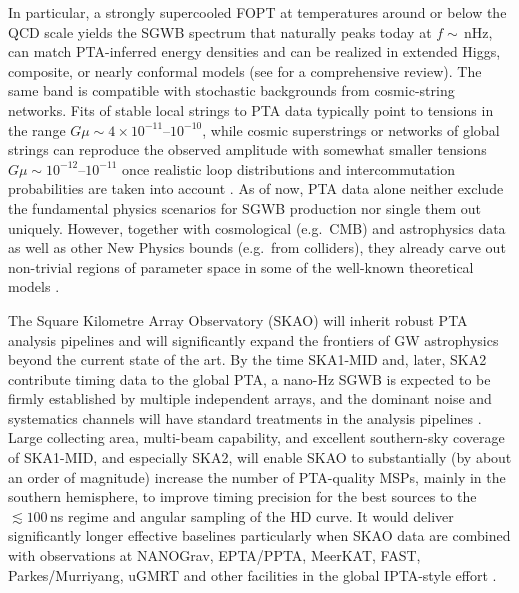 \documentclass[a4paper,11pt]{article}
\begin{document}
In particular, a strongly supercooled FOPT at temperatures around or below the QCD 
scale yields the SGWB spectrum that naturally peaks today at $f\sim\,$nHz, can match 
PTA-inferred energy densities and can be realized in extended Higgs, composite, or 
nearly conformal models (see \citep{Caprini:2018csg} for a comprehensive review). 
The same band is compatible with stochastic backgrounds from cosmic-string networks. 
Fits of stable local strings to PTA data typically point to tensions in the range 
$G\mu \sim 4\times 10^{-11}$–$10^{-10}$, while cosmic superstrings or networks of 
global strings can reproduce the observed amplitude with somewhat smaller tensions 
$G\mu \sim 10^{-12}$–$10^{-11}$ once realistic loop distributions and intercommutation
probabilities are taken into account \citep{Ellis:2020ena,Blasi:2020mfx,
Ellis:2023tsl,Wang:2023CSloops,Kume:2024CSbounds}. As of now, PTA data 
alone neither exclude the fundamental physics scenarios for SGWB production nor single 
them out uniquely. However, together with cosmological (e.g.~CMB) and astrophysics data 
as well as other New Physics bounds (e.g.~from colliders), they already carve out non-trivial 
regions of parameter space in some of the well-known theoretical models
\citep{Caldwell:2022DEUGW,Bian:2025GWcosmology,Roshan:2025FirstSecond}.

The Square Kilometre Array Observatory (SKAO) will inherit robust PTA analysis pipelines and
will significantly expand the frontiers of GW astrophysics beyond the current state of the art. 
By the time SKA1-MID and, later, SKA2 contribute timing data to the global PTA, a nano-Hz SGWB 
is expected to be firmly established by multiple independent arrays, and the dominant noise 
and systematics channels will have standard treatments in the analysis pipelines
\citep{Antoniadis:2022yph,Taylor:2025SKAReview}. Large collecting area, multi-beam capability, 
and excellent southern-sky coverage of SKA1-MID, and especially SKA2, will enable SKAO to
substantially (by about an order of magnitude) increase the number of PTA-quality MSPs, mainly 
in the southern hemisphere, to improve timing precision for the best sources to the $\lesssim 
100$\,ns regime and angular sampling of the HD curve. It would deliver significantly longer 
effective baselines particularly when SKAO data are combined with observations at NANOGrav, 
EPTA/PPTA, MeerKAT, FAST, Parkes/Murriyang, uGMRT and other facilities in the global IPTA-style 
effort \citep{Janssen:2015SKA,Stappers:2018rsta,Liu:2011cka,Smits:2009,SKAO:Perf2024}. 
\end{document}
